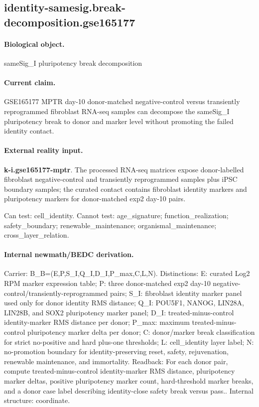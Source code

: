 \subsection{identity-samesig.break-decomposition.gse165177}

\paragraph{Biological object.} sameSig\_I pluripotency break decomposition

\paragraph{Current claim.} GSE165177 MPTR day-10 donor-matched negative-control versus transiently reprogrammed fibroblast RNA-seq samples can decompose the sameSig\_I pluripotency break to donor and marker level without promoting the failed identity contact.

\paragraph{External reality input.}
\textbf{k-i.gse165177-mptr}. The processed RNA-seq matrices expose donor-labelled fibroblast negative-control and transiently reprogrammed samples plus iPSC boundary samples; the curated contact contains fibroblast identity markers and pluripotency markers for donor-matched exp2 day-10 pairs.

Can test: cell\_identity. Cannot test: age\_signature; function\_realization; safety\_boundary; renewable\_maintenance; organismal\_maintenance; cross\_layer\_relation.

\paragraph{Internal newmath/BEDC derivation.} Carrier: B\_B=(E,P,S\_I,Q\_I,D\_I,P\_max,C,L,N). Distinctions: E: curated Log2 RPM marker expression table; P: three donor-matched exp2 day-10 negative-control/transiently-reprogrammed pairs; S\_I: fibroblast identity marker panel used only for donor identity RMS distance; Q\_I: POU5F1, NANOG, LIN28A, LIN28B, and SOX2 pluripotency marker panel; D\_I: treated-minus-control identity-marker RMS distance per donor; P\_max: maximum treated-minus-control pluripotency marker delta per donor; C: donor/marker break classification for strict no-positive and hard plus-one thresholds; L: cell\_identity layer label; N: no-promotion boundary for identity-preserving reset, safety, rejuvenation, renewable maintenance, and immortality. Readback: For each donor pair, compute treated-minus-control identity-marker RMS distance, pluripotency marker deltas, positive pluripotency marker count, hard-threshold marker breaks, and a donor case label describing identity-close safety break versus pass.. Internal structure: coordinate.

